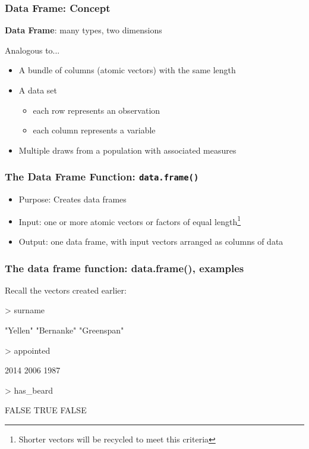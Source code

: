 \documentclass{beamer}
\newcommand{\R}[1]{\texttt{#1}}
\begin{document}
\begin{frame}[fragile]
\frametitle{Data Frame: Concept}

\textbf{Data Frame}: many types, two dimensions
\pause

Analogous to...
\begin{itemize}
\item A bundle of columns (atomic vectors) with the same length
\item A data set 
    \begin{itemize} 
    \item each row represents an observation
    \item each column represents a variable 
    \end{itemize}
\item Multiple draws from a population with associated measures
\end{itemize}

\end{frame}



\begin{frame}[fragile]
\frametitle{The Data Frame Function: \R{data.frame()}}

\begin{itemize}
\item Purpose: Creates data frames
\item Input: one or more atomic vectors or factors of equal length\footnote{Shorter vectors will be recycled to meet this criteria}
\item Output: one data frame, with input vectors arranged as columns of data
\end{itemize}

\end{frame}



\begin{frame}[fragile]
\frametitle{The data frame function: data.frame(), examples}

Recall the vectors created earlier:
\begin{Schunk}
\begin{Sinput}
> surname
\end{Sinput}
\begin{Soutput}
[1] "Yellen"    "Bernanke"  "Greenspan"
\end{Soutput}
\begin{Sinput}
> appointed
\end{Sinput}
\begin{Soutput}
[1] 2014 2006 1987
\end{Soutput}
\begin{Sinput}
> has_beard
\end{Sinput}
\begin{Soutput}
[1] FALSE  TRUE FALSE
\end{Soutput}
\end{Schunk}

\end{frame}
\end{document}
